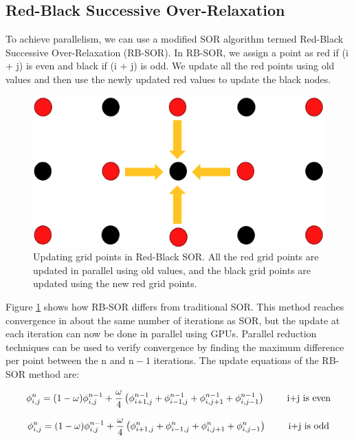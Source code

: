 \subsection*{Red-Black Successive Over-Relaxation}
To achieve parallelism, we can use a modified SOR algorithm termed Red-Black Successive Over-Relaxation (RB-SOR). In RB-SOR, we assign a point as red if (i + j) is even and black if (i + j) is odd. We update all the red points using old values and then use the newly updated red values to update the black nodes.

\begin{figure}[!htb]
\centering
 \vspace{0.2cm}
 \includegraphics[width=0.4\linewidth]{ch4/figs/RB-SOR.png}
 \vspace{0.3cm}
\caption{\label{fig:rb_sor_methods} Updating grid points in Red-Black SOR. All the red grid points are updated in parallel using old values, and the black grid points are updated using the new red grid points.}
\end{figure}

Figure \ref{fig:rb_sor_methods} shows how RB-SOR differs from traditional SOR. This method reaches convergence in about the same number of iterations as SOR, but the update at each iteration can now be done in parallel using GPUs. Parallel reduction techniques can be used to verify convergence by finding the maximum difference per point between the $\text{n}$ and $\text{n}-1$ iterations. The update equations of the RB-SOR method are:

\begin{equation}{\label{rb_e}}
 \phi_{i,j}^{n} = (1-\omega)\phi^{n-1}_{i,j} + \frac{\omega}{4} \left(\phi^{n-1}_{i+1,j} + \phi^{n-1}_{i-1,j} + \phi^{n-1}_{i,j+1} + \phi^{n-1}_{i,j-1} \right) \qquad \text{ i+j is even}
\end{equation}

\begin{equation}{\label{rb_o}}
 \phi_{i,j}^{n} = (1-\omega)\phi^{n-1}_{i,j} + \frac{\omega}{4} \left(\phi^{n}_{i+1,j} + \phi^n_{i-1,j} + \phi^{n}_{i,j+1} + \phi^n_{i,j-1} \right) \qquad \text{ i+j is odd}
\end{equation}

